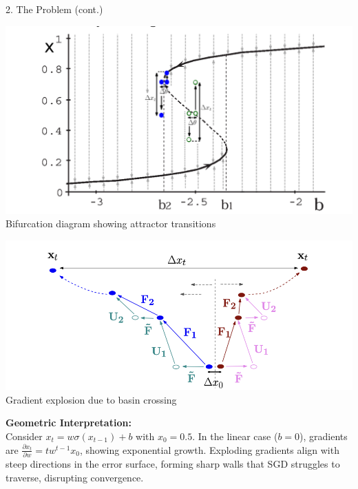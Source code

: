 \begin{frame}[t]
\begin{columns}[t,totalwidth=\textwidth]
\begin{column}{0.3\textwidth}
\begin{block}{2. The Problem (cont.)}
    \begin{center}
        \includegraphics[width=0.9\linewidth]{figures/bifurcation.png} \\
        \small Bifurcation diagram showing attractor transitions
    \end{center}
    
    \begin{center}
        \includegraphics[width=0.9\linewidth]{figures/function_and_input.png} \\
        \small Gradient explosion due to basin crossing
    \end{center}

    \vspace{0.5em}
    \textbf{Geometric Interpretation:} \\
    Consider $x_t = w\sigma(x_{t-1}) + b$ with $x_0 = 0.5$. In the linear case ($b = 0$), gradients are $\frac{\partial x_t}{\partial w} = t w^{t-1} x_0$, showing exponential growth. Exploding gradients align with steep directions in the error surface, forming sharp walls that SGD struggles to traverse, disrupting convergence.


\end{block}
\end{column}
\end{columns}
\end{frame}
